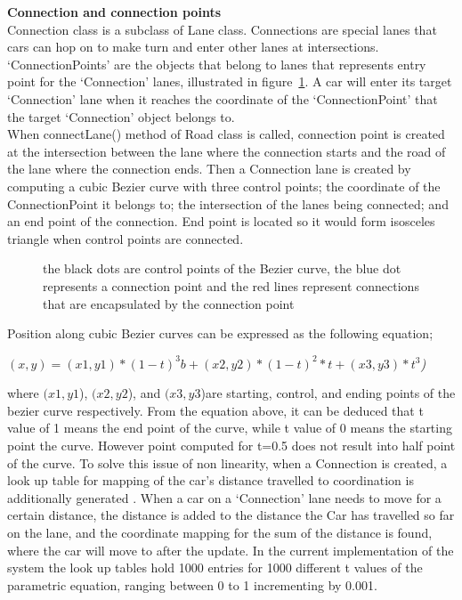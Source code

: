 \documentclass[11pt]{article}
\begin{document}
\textbf{Connection and connection points}\\
Connection class is a subclass of Lane class. Connections are special lanes that cars can hop on  to make turn and enter other lanes at intersections. `ConnectionPoints' are the objects that belong to lanes that represents entry point for the `Connection' lanes, illustrated in figure~\ref{fig:connectionpoint}. A car will enter its target `Connection' lane when it reaches the coordinate of the `ConnectionPoint' that the target `Connection' object belongs to. \\
When connectLane() method of Road class is called, connection point is created at the intersection between the lane where the connection starts and the road of the lane where the connection ends. Then a Connection lane is created by computing a cubic Bezier curve with three control points; the coordinate of the ConnectionPoint it belongs to; the intersection of the lanes being connected; and an end point of the connection. End point is located so it would form isosceles triangle when control points are connected. 
	
\begin{figure}[!htb]
\centering
\setlength{\fboxsep}{0pt}%
\setlength{\fboxrule}{1pt}%
\caption{the black dots are control points of the Bezier curve, the blue dot represents a connection point and the red lines represent connections that are encapsulated by the connection point}
\label{fig:connectionpoint}
\end{figure}

 Position along cubic Bezier curves can be expressed as the following equation;\\
 \begin{center}
 \emph{\((x,y)= (x1,y1)*(1-t)^3 b+ (x2,y2)*(1-t)^2*t + (x3,y3)*t^3\))} \\
 \end{center}
where \((x1,y1\)), \((x2,y2\)), and \((x3,y3\))are starting, control, and ending points of the bezier curve respectively.
From the equation above, it can be deduced that t value of 1 means the end point of the curve, while t value of 0 means the starting point the curve. However point computed for t=0.5 does not result into half point of the curve. To solve this issue of non linearity, when a Connection is created, a look up table for mapping of the car's distance travelled to coordination is additionally generated \cite{BCurve}. When a car on a `Connection' lane needs to move for a certain distance, the distance is added to the distance the Car has travelled so far on the lane, and the coordinate mapping for the sum of the distance is found, where the car will move to after the update. In the current implementation of the system  the look up tables hold 1000 entries for 1000 different t values of the parametric equation, ranging between 0 to 1 incrementing by 0.001.
\end{document}
